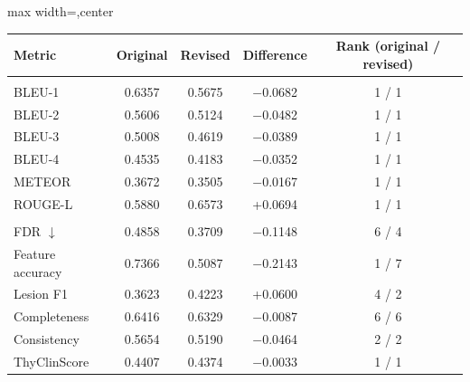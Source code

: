 \begin{responsetable}
\caption{}
\begin{adjustbox}{max width=\textwidth,center}
{\footnotesize\setlength{\tabcolsep}{8pt}
\begin{tabular}{@{}lcccc@{}}
\toprule
\textbf{Metric} & \textbf{Original} & \textbf{Revised} & \textbf{Difference} & \textbf{Rank (original / revised)} \\
\midrule
\rowcolor{ResponseTableGray}\multicolumn{5}{c}{\textbf{Lexical metrics}} \\
BLEU-1 & 0.6357 & 0.5675 & $-$0.0682 & 1 / 1 \\
BLEU-2 & 0.5606 & 0.5124 & $-$0.0482 & 1 / 1 \\
BLEU-3 & 0.5008 & 0.4619 & $-$0.0389 & 1 / 1 \\
BLEU-4 & 0.4535 & 0.4183 & $-$0.0352 & 1 / 1 \\
METEOR & 0.3672 & 0.3505 & $-$0.0167 & 1 / 1 \\
ROUGE-L & 0.5880 & 0.6573 & +0.0694 & 1 / 1 \\
\rowcolor{ResponseTableGray}\multicolumn{5}{c}{\textbf{Clinical semantic metrics}} \\
FDR $\downarrow$ & 0.4858 & 0.3709 & $-$0.1148 & 6 / 4 \\
Feature accuracy & 0.7366 & 0.5087 & $-$0.2143 & 1 / 7 \\
Lesion F1 & 0.3623 & 0.4223 & +0.0600 & 4 / 2 \\
Completeness & 0.6416 & 0.6329 & $-$0.0087 & 6 / 6 \\
Consistency & 0.5654 & 0.5190 & $-$0.0464 & 2 / 2 \\
ThyClinScore & 0.4407 & 0.4374 & $-$0.0033 & 1 / 1 \\
\bottomrule
\end{tabular}}
\end{adjustbox}

\end{responsetable}
